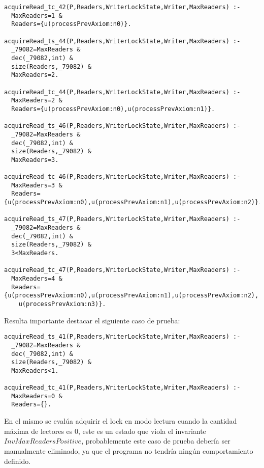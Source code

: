 \documentclass[a4paper, 12pt]{article}
\begin{document}
\begin{verbatim}
acquireRead_tc_42(P,Readers,WriterLockState,Writer,MaxReaders) :-
  MaxReaders=1 &
  Readers={u(processPrevAxiom:n0)}.

acquireRead_ts_44(P,Readers,WriterLockState,Writer,MaxReaders) :-
  _79082=MaxReaders &
  dec(_79082,int) &
  size(Readers,_79082) &
  MaxReaders=2.

acquireRead_tc_44(P,Readers,WriterLockState,Writer,MaxReaders) :-
  MaxReaders=2 &
  Readers={u(processPrevAxiom:n0),u(processPrevAxiom:n1)}.

acquireRead_ts_46(P,Readers,WriterLockState,Writer,MaxReaders) :-
  _79082=MaxReaders &
  dec(_79082,int) &
  size(Readers,_79082) &
  MaxReaders=3.

acquireRead_tc_46(P,Readers,WriterLockState,Writer,MaxReaders) :-
  MaxReaders=3 &
  Readers={u(processPrevAxiom:n0),u(processPrevAxiom:n1),u(processPrevAxiom:n2)}.

acquireRead_ts_47(P,Readers,WriterLockState,Writer,MaxReaders) :-
  _79082=MaxReaders &
  dec(_79082,int) &
  size(Readers,_79082) &
  3<MaxReaders.

acquireRead_tc_47(P,Readers,WriterLockState,Writer,MaxReaders) :-
  MaxReaders=4 &
  Readers={u(processPrevAxiom:n0),u(processPrevAxiom:n1),u(processPrevAxiom:n2),
    u(processPrevAxiom:n3)}.
\end{verbatim}

Resulta importante destacar el siguiente caso de prueba:
\begin{verbatim}
acquireRead_ts_41(P,Readers,WriterLockState,Writer,MaxReaders) :-
  _79082=MaxReaders &
  dec(_79082,int) &
  size(Readers,_79082) &
  MaxReaders<1.

acquireRead_tc_41(P,Readers,WriterLockState,Writer,MaxReaders) :-
  MaxReaders=0 &
  Readers={}.
\end{verbatim}
En el mismo se evalúa adquirir el lock en modo lectura cuando la cantidad máxima de lectores es 0, este es un estado que viola el invariante $InvMaxReadersPositive$, probablemente este caso de prueba debería ser manualmente eliminado, ya que el programa no tendría ningún comportamiento definido.
\end{document}
